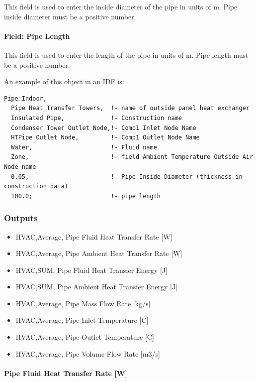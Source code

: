 This field is used to enter the inside diameter of the pipe in units of m. Pipe inside diameter must be a positive number.

\paragraph{Field: Pipe Length}\label{field-pipe-length-000}

This field is used to enter the length of the pipe in units of m. Pipe length must be a positive number.

An example of this object in an IDF is:

\begin{lstlisting}
Pipe:Indoor,
  Pipe Heat Transfer Towers,  !- name of outside panel heat exchanger
  Insulated Pipe,             !- Construction name
  Condenser Tower Outlet Node,!- Comp1 Inlet Node Name
  HTPipe Outlet Node,         !- Comp1 Outlet Node Name
  Water,                      !- Fluid name
  Zone,                       !- field Ambient Temperature Outside Air Node name
  0.05,                       !- Pipe Inside Diameter (thickness in construction data)
  100.0;                      !- pipe length
\end{lstlisting}

\subsubsection{Outputs}\label{outputs-6-005}

\begin{itemize}
\item
  HVAC,Average, Pipe Fluid Heat Transfer Rate {[}W{]}
\item
  HVAC,Average, Pipe Ambient Heat Transfer Rate {[}W{]}
\item
  HVAC,SUM, Pipe Fluid Heat Transfer Energy {[}J{]}
\item
  HVAC,SUM, Pipe Ambient Heat Transfer Energy {[}J{]}
\item
  HVAC,Average, Pipe Mass Flow Rate {[}kg/s{]}
\item
  HVAC,Average, Pipe Inlet Temperature {[}C{]}
\item
  HVAC,Average, Pipe Outlet Temperature {[}C{]}
\item
  HVAC,Average, Pipe Volume Flow Rate {[}m3/s{]}
\end{itemize}

\paragraph{Pipe Fluid Heat Transfer Rate {[}W{]}}\label{pipe-fluid-heat-transfer-rate-w}

